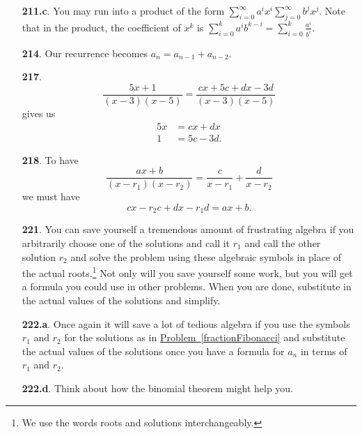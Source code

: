 \documentclass[10pt,]{book}
\theoremstyle{plain}
\theoremstyle{definition}
\theoremstyle{definition}
\numberwithin{equation}{chapter}
\newcommand{\amp}{&}
\begin{document}
\begin{itemize}[itemsep=1em]
\item[\textbf{211.c}.]\hypertarget{p-1231}{}%
You may run into a product of the form \(\sum_{i=0}^\infty a^ix^i\sum_{j=0}^\infty b^jx^j\). Note that in the product, the coefficient of \(x^k\) is \(\sum_{i=0}^k a^ib^{k-i} = \sum_{i=0}^k \frac{a^i}{b^i}\).%

\item[\textbf{214}.]\hypertarget{p-1239}{}%
Our recurrence becomes \(a_n = a_{n-1} + a_{n-2}\).%

\item[\textbf{217}.]\hypertarget{p-1248}{}%
%
\begin{equation*}
\frac{5x+1}{(x-3)(x-5)} = \frac{cx+5c+dx-3d}{(x-3)(x-5)}
\end{equation*}
gives us%
\begin{align*}
5x \amp = cx+dx\\
1 \amp= 5c-3d\text{.}
\end{align*}
%

\item[\textbf{218}.]\hypertarget{p-1251}{}%
To have%
\begin{equation*}
\frac{ax+b}{(x-r_1)(x-r_2)} = \frac{c}{x-r_1} + \frac{d}{x-r_2}
\end{equation*}
we must have%
\begin{equation*}
cx-r_2c+dx-r_1d =ax+b\text{.}
\end{equation*}
%

\item[\textbf{221}.]\hypertarget{p-1259}{}%
You can save yourself a tremendous amount of frustrating algebra if you arbitrarily choose one of the solutions and call it \(r_1\) and call the other solution \(r_2\) and solve the problem using these algebraic symbols in place of the actual roots.\footnote{We use the words roots and solutions interchangeably.\label{fn-15}} Not only will you save yourself some work, but you will get a formula you could use in other problems. When you are done, substitute in the actual values of the solutions and simplify.%

\item[\textbf{222.a}.]\hypertarget{p-1262}{}%
Once again it will save a lot of tedious algebra if you use the symbols \(r_1\) and \(r_2\) for the solutions as in \hyperref[fractionFibonacci]{Problem~\ref{fractionFibonacci}} and substitute the actual values of the solutions once you have a formula for \(a_n\) in terms of \(r_1\) and \(r_2\).%

\item[\textbf{222.d}.]\hypertarget{p-1269}{}%
Think about how the binomial theorem might help you.%


\end{itemize}
\end{document}
